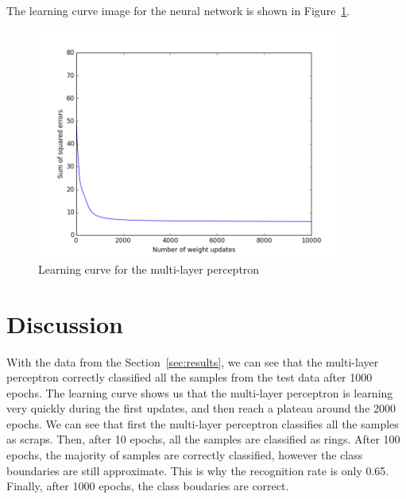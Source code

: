 \documentclass[]{article}
\begin{document}
The learning curve image for the neural network is shown in Figure~\ref{fig:mlp_learning_curve}.

\begin{figure}[p]
    \centering
    \includegraphics[width=0.9\textwidth]{figures/mlp_learning_curve.png}
    \caption{Learning curve for the multi-layer perceptron}
    \label{fig:mlp_learning_curve}
\end{figure}




\section{Discussion}

With the data from the Section~\ref{sec:results}, we can see that the multi-layer perceptron correctly classified all the samples from the test data after 1000 epochs.
The learning curve shows us that the multi-layer perceptron is learning very quickly during the first updates, and then reach a plateau around the 2000 epochs.
We can see that first the multi-layer perceptron classifies all the samples as scraps. Then, after 10 epochs, all the samples are classified as rings. After 100 epochs, the majority of samples are correctly classified, however the class boundaries are still approximate. This is why the recognition rate is only 0.65. Finally, after 1000 epochs, the class boudaries are correct.


\end{document}
